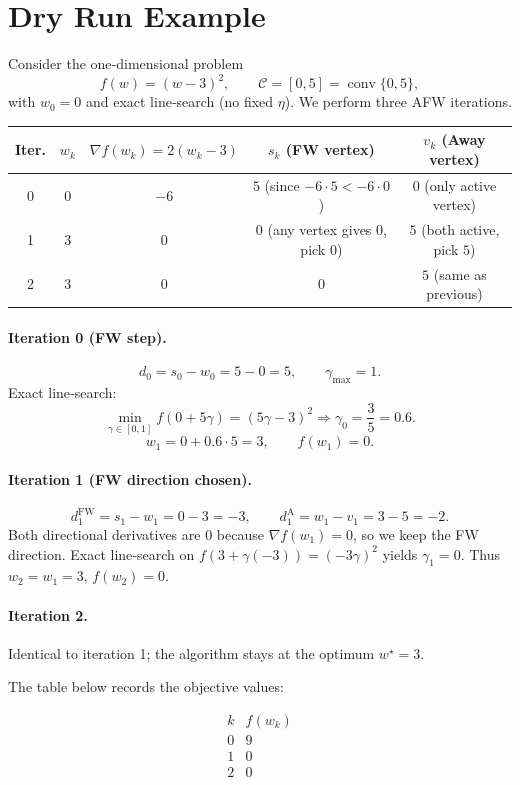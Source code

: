 \documentclass{article}
\newcommand{\C}{\mathcal{C}}
\begin{document}
\section*{Dry Run Example}
Consider the one‑dimensional problem
\[
f(w)=(w-3)^2,\qquad \C=[0,5]=\operatorname{conv}\{0,5\},
\]
with $w_0=0$ and exact line‑search (no fixed $\eta$).  
We perform three AFW iterations.

\begin{center}
\begin{tabular}{c|c|c|c|c}
\textbf{Iter.} & $w_k$ & $\nabla f(w_k)=2(w_k-3)$ & $s_k$ (FW vertex) & $v_k$ (Away vertex) \\ \hline
0 & $0$ & $-6$ & $5$ (since $-6\cdot5<-6\cdot0$) & $0$ (only active vertex)\\
1 & $3$ & $0$  & $0$ (any vertex gives $0$, pick $0$) & $5$ (both active, pick $5$)\\
2 & $3$ & $0$  & $0$ & $5$ (same as previous)\\
\end{tabular}
\end{center}

\paragraph{Iteration 0 (FW step).}
\[
d_0 = s_0-w_0 = 5-0 = 5,\qquad
\gamma_{\max}=1.
\]
Exact line‑search:
\[
\min_{\gamma\in[0,1]} f(0+5\gamma) = (5\gamma-3)^2
\Longrightarrow \gamma_0=\frac{3}{5}=0.6 .
\]
\[
w_1 = 0 + 0.6\cdot5 = 3,\qquad
f(w_1)=0.
\]

\paragraph{Iteration 1 (FW direction chosen).}
\[
d_1^{\text{FW}} = s_1-w_1 = 0-3 = -3,\qquad
d_1^{\text{A}} = w_1-v_1 = 3-5 = -2.
\]
Both directional derivatives are $0$ because $\nabla f(w_1)=0$, so we keep the FW direction.
Exact line‑search on $f(3+\gamma(-3))=( -3\gamma)^2$ yields $\gamma_1=0$.
Thus $w_2=w_1=3$, $f(w_2)=0$.

\paragraph{Iteration 2.}
Identical to iteration 1; the algorithm stays at the optimum $w^\star=3$.

The table below records the objective values:

\[
\begin{array}{c|c}
k & f(w_k)\\ \hline
0 & 9\\
1 & 0\\
2 & 0\\
\end{array}
\]
\end{document}
